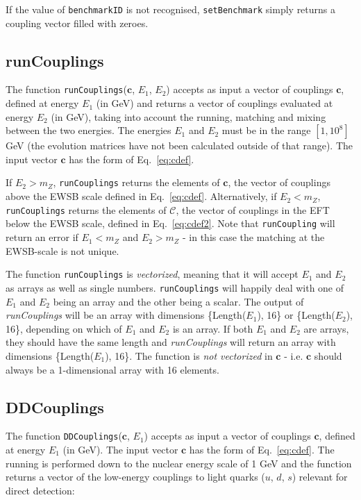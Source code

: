 \documentclass[notitlepage,12pt]{article}
\begin{document}
If the value of \texttt{benchmarkID} is not recognised, \texttt{setBenchmark} simply returns a coupling vector filled with zeroes.

\subsection{runCouplings}

The function \texttt{runCouplings}($\mathbf{c}$, $E_1$, $E_2$) accepts as input a vector of couplings $\mathbf{c}$, defined at energy $E_1$ (in GeV) and returns a vector of couplings evaluated at energy $E_2$ (in GeV), taking into account the running, matching and mixing between the two energies. The energies $E_1$ and $E_2$ must be in the range $[1, 10^8]$ GeV (the evolution matrices have not been calculated outside of that range). The input vector $\mathbf{c}$ has the form of Eq.~\ref{eq:cdef}.

 If $E_2 > m_Z$, \texttt{runCouplings} returns the elements of $\mathbf{c}$, the vector of couplings above the EWSB scale defined in Eq.~\ref{eq:cdef}. Alternatively, if $E_2 < m_Z$, \texttt{runCouplings} returns the elements of $\mathbf{\mathcal{C}}$, the vector of couplings in the EFT below the EWSB scale, defined in Eq.~\ref{eq:cdef2}. Note that \texttt{runCoupling} will return an error if $E_1 < m_Z$ and $E_2 > m_Z$ - in this case the matching at the EWSB-scale is not unique.

The function \texttt{runCouplings} is \textit{vectorized}, meaning that it will accept $E_1$ and $E_2$ as arrays as well as single numbers. \texttt{runCouplings} will happily deal with one of $E_1$ and $E_2$ being an array and the other being a scalar. The output of \textit{runCouplings} will be an array with dimensions \{Length($E_1$), 16\} or \{Length($E_2$), 16\}, depending on which of $E_1$ and $E_2$ is an array. If both $E_1$ and $E_2$ are arrays, they should have the same length and \textit{runCouplings} will return an array with dimensions \{Length($E_1$), 16\}. The function is \textit{not vectorized} in $\mathbf{c}$ - i.e. $\mathbf{c}$ should always be a 1-dimensional array with 16 elements.

\subsection{DDCouplings}
\label{sec:DDCouplings}

The function \texttt{DDCouplings}($\mathbf{c}$, $E_1$) accepts as input a vector of couplings $\mathbf{c}$, defined at energy $E_1$ (in GeV). The input vector $\mathbf{c}$ has the form of Eq.~\ref{eq:cdef}. The running is performed down to the nuclear energy scale of 1 GeV and the function returns a vector of the low-energy couplings to light quarks ($u$, $d$, $s$) relevant for direct detection:
\end{document}
